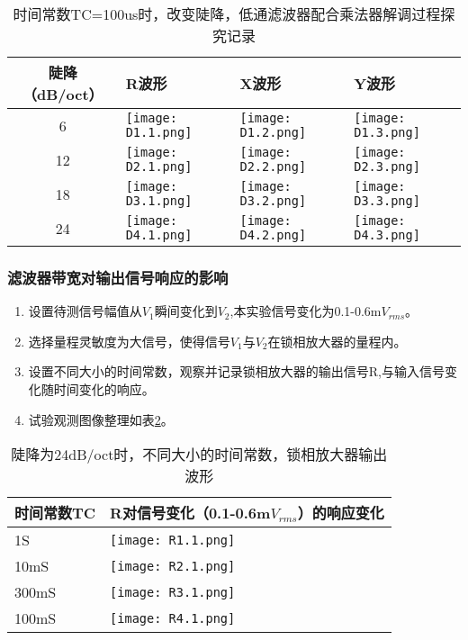 \documentclass[dvipsnames, svgnames,a4paper,11pt]{article}
\begin{document}
		\begin{table}[ht]
			\centering
			\begin{tabularx}{\textwidth}{|c|X|X|X|}
				\hline
				陡降（dB/oct） & R波形  & X波形  & Y波形 \\
				\hline
				6 & \texttt{[image: D1.1.png]} & \texttt{[image: D1.2.png]} &\texttt{[image: D1.3.png]}\\
				\hline
				12 & \texttt{[image: D2.1.png]}  & \texttt{[image: D2.2.png]}  & \texttt{[image: D2.3.png]} \\
				\hline
				18 & \texttt{[image: D3.1.png]}  & \texttt{[image: D3.2.png]}   & \texttt{[image: D3.3.png]}   \\
				\hline
				24 & \texttt{[image: D4.1.png]}   & \texttt{[image: D4.2.png]}   & \texttt{[image: D4.3.png]}  \\
				\hline
			\end{tabularx}
			\caption{时间常数TC=100us时，改变陡降，低通滤波器配合乘法器解调过程探究记录}
			\label{tab:2}
			\end{table}

	\subsubsection{滤波器带宽对输出信号响应的影响}
			\begin{enumerate}
				\item 设置待测信号幅值从$V_1$瞬间变化到$V_2$,本实验信号变化为0.1-0.6m$V_{rms}$。
				\item 选择量程灵敏度为大信号，使得信号$V_1$与$V_2$在锁相放大器的量程内。
				\item 设置不同大小的时间常数，观察并记录锁相放大器的输出信号R,与输入信号变化随时间变化的响应。
				\item 试验观测图像整理如表\ref{tab:3}。
			\end{enumerate}

			\begin{table}[ht]
				\centering
				\begin{tabularx}{\textwidth}{|X|X|}
					\hline
					时间常数TC & R对信号变化（0.1-0.6m$V_{rms}$）的响应变化 \\
					\hline
					1S & \texttt{[image: R1.1.png]}    \\
					\hline
					10mS& \texttt{[image: R2.1.png]}     \\
					\hline
					300mS &\texttt{[image: R3.1.png]}    \\
					\hline
					100mS & \texttt{[image: R4.1.png]}     \\
					\hline
				\end{tabularx}
				\caption{陡降为24dB/oct时，不同大小的时间常数，锁相放大器输出波形}
				\label{tab:3}
				\end{table}
\end{document}
